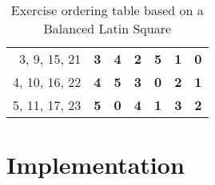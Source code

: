 \begin{table}[]
{\begin{tabular}{rcccccc}
\multicolumn{1}{r|}{3, 9, 15, 21} & \multicolumn{1}{c|}{\textbf{3}} & \multicolumn{1}{c|}{\textbf{4}} & \multicolumn{1}{c|}{\textbf{2}} & \multicolumn{1}{c|}{\textbf{5}} & \multicolumn{1}{c|}{\textbf{1}} & \multicolumn{1}{c|}{\textbf{0}} \\ \cline{2-7} 
\multicolumn{1}{r|}{4, 10, 16, 22} & \multicolumn{1}{c|}{\textbf{4}} & \multicolumn{1}{c|}{\textbf{5}} & \multicolumn{1}{c|}{\textbf{3}} & \multicolumn{1}{c|}{\textbf{0}} & \multicolumn{1}{c|}{\textbf{2}} & \multicolumn{1}{c|}{\textbf{1}} \\ \cline{2-7} 
\multicolumn{1}{r|}{5, 11, 17, 23} & \multicolumn{1}{c|}{\textbf{5}} & \multicolumn{1}{c|}{\textbf{0}} & \multicolumn{1}{c|}{\textbf{4}} & \multicolumn{1}{c|}{\textbf{1}} & \multicolumn{1}{c|}{\textbf{3}} & \multicolumn{1}{c|}{\textbf{2}} \\ \cline{2-7} 
\end{tabular}%
}
\caption{Exercise ordering table based on a Balanced Latin Square}
\label{my-label}
\end{table}




\section{Implementation}




